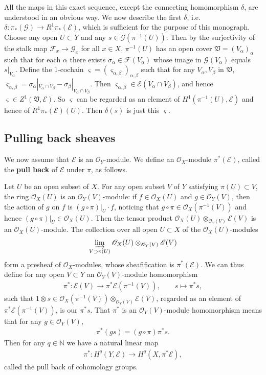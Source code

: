 \documentclass[12pt,a4paper,notitlepage]{report}
\theoremstyle{definition}
\theoremstyle{plain}
\newcommand{\fk}{\mathfrak}
\newcommand{\scr}{\mathscr}
\numberwithin{equation}{section}
\begin{document}
All the maps in this exact sequence, except the connecting homomorphism $\delta$,  are understood in an obvious way. We now describe the first $\delta$, i.e. $\delta:\pi_*(\scr G)\rightarrow R^1\pi_*(\scr E)$, which is sufficient for the purpose of this monograph. Choose any open $ U\subset Y$ and any $s\in\scr G(\pi^{-1}( U))$. Then by the surjectivity of the stalk map $\scr F_x\rightarrow\scr G_x$ for all $x\in X$, $\pi^{-1}( U)$ has an open cover $\fk V=(V_\alpha)_\alpha$ such that for each $\alpha$ there exists $\sigma_\alpha\in \scr F( V_\alpha)$ whose image in $\scr G( V_\alpha)$ equals $s|_{ V_\alpha}$. Define the $1$-cochain $\varsigma=(\varsigma_{\alpha,\beta})_{\alpha,\beta}$ such that for any $ V_\alpha, V_\beta$ in $\fk V$, $\varsigma_{\alpha,\beta}=\sigma_\alpha|_{ V_\alpha\cap V_\beta}-\sigma_\beta|_{ V_\alpha\cap V_\beta}$. Then $\varsigma_{\alpha,\beta}\in\scr E( V_\alpha\cap V_\beta)$, and hence $\varsigma\in Z^1(\fk V,\scr E)$. So $\varsigma$ can be regarded as an element of $H^1(\pi^{-1}( U),\scr E)$ and hence of $R^1\pi_*(\scr E)(U)$. Then $\delta (s)$ is just this $\varsigma$.


\subsection*{Pulling back  sheaves}


We now assume that $\scr E$ is an $\scr O_Y$-module. We define an $\scr O_X$-module $\pi^*(\scr E)$, called the \textbf{pull back} of $\scr E$ under $\pi$, \index{Epi@$\pi^*(\scr E),\pi^*s$} as follows. 


Let $U$ be an open subset of $X$. For any open subset $V$ of $Y$ satisfying $\pi(U)\subset V$, the ring $\scr O_X(U)$ is an $\scr O_Y(V)$-module: if $f\in\scr O_X(U)$ and $g\in\scr O_Y(V)$, then the action of $g$ on $f$ is $(g\circ \pi)|_U\cdot f$, noticing that $g\circ \pi\in\scr O_X(\pi^{-1}(V))$ and hence $(g\circ \pi)|_U\in\scr O_X(U)$. Then the tensor product $\scr O_X(U)\otimes_{\scr O_Y(V)}\scr E(V)$ is an $\scr O_X(U)$-module. The collection over all open $U\subset X$ of the $\scr O_X(U)$-modules
\begin{align*}
\varinjlim_{V\supset \pi(U)}\scr O_X(U)\otimes_{\scr O_Y(V)}\scr E(V)
\end{align*}
form a presheaf of $\scr O_X$-modules, whose sheafification is $\pi^*(\scr E)$. We can thus define  for any open $V\subset Y$ an $\scr O_Y(V)$-module homomorphism
\begin{align}
\pi^*:\scr E(V)\rightarrow\pi^*\scr E(\pi^{-1}(V)),\qquad s\mapsto\pi^*s,\label{eq139}
\end{align}
such that  $1\otimes s\in\scr O_X(\pi^{-1}(V))\otimes_{\scr O_Y(V)}\scr E(V)$, regarded as an element of $\pi^*\scr E(\pi^{-1}(V))$, is our $\pi^*s$. That $\pi^*$ is an $\scr O_Y(V)$-module homomorphism means that for any $g\in\scr O_Y(V)$,
\begin{align*}
\pi^*(gs)=(g\circ\pi)\pi^*s.
\end{align*}
Then for any $q\in\mathbb N$ we have a natural linear map
\begin{align*}
\pi^*:H^q(Y,\scr E)\rightarrow H^q(X,\pi^*\scr E),
\end{align*}
called the pull back of cohomology groups.
\end{document}
